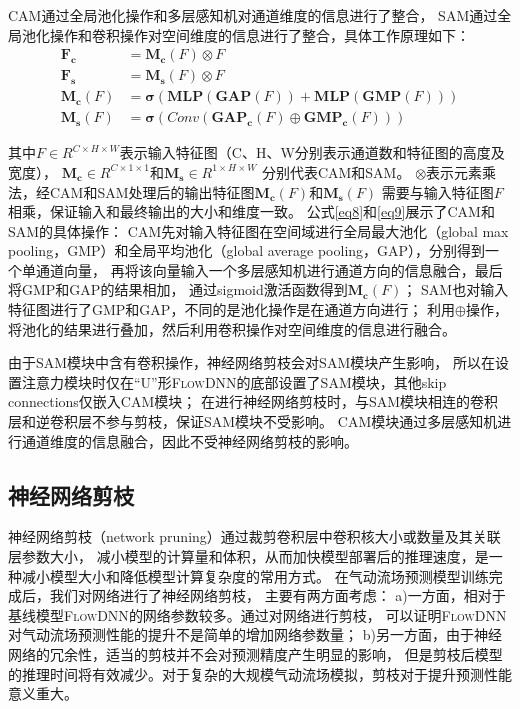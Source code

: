 CAM通过全局池化操作和多层感知机对通道维度的信息进行了整合，
SAM通过全局池化操作和卷积操作对空间维度的信息进行了整合，具体工作原理如下：
\begin{align}
\mathbf{F}_{\mathbf{c}} &=\mathbf{M}_{\mathbf{c}}(F) \otimes F \\
\mathbf{F}_{\mathbf{s}} &=\mathbf{M}_{\mathbf{s}}\left(F\right) \otimes F \\
\mathbf{M}_{\mathbf{c}}(F) &=\mathbf{\sigma}(\mathbf{MLP}(\mathbf{GAP}(F))+\mathbf{MLP}(\mathbf{GMP}(F))) \label{eq8}\\
\mathbf{M}_{\mathbf{s}}(F) &=\mathbf{\sigma}\left(Conv\left(\mathbf{GAP}_\mathbf{c}\left(F\right) \oplus \mathbf{GMP}_\mathbf{c}\left(F\right)\right)\right) \label{eq9}
\end{align}

\noindent 其中$F \in R^{C \times H \times W}$表示输入特征图（C、H、W分别表示通道数和特征图的高度及宽度），
$\mathbf{M}_{\mathbf{c}} \in R^{C \times 1 \times 1}$和$\mathbf{M}_{\mathbf{s}} \in R^{1 \times H \times W}$
分别代表CAM和SAM。
$\otimes$表示元素乘法，经CAM和SAM处理后的输出特征图$\mathbf{M}_{\mathbf{c}}(F)$和$\mathbf{M}_{\mathbf{s}}\left(F\right)$
需要与输入特征图$F$相乘，保证输入和最终输出的大小和维度一致。
公式\ref{eq8}和\ref{eq9}展示了CAM和SAM的具体操作：
CAM先对输入特征图在空间域进行全局最大池化（global  max pooling，GMP）和全局平均池化（global average pooling，GAP），分别得到一个单通道向量，
再将该向量输入一个多层感知机进行通道方向的信息融合，最后将GMP和GAP的结果相加，
通过sigmoid激活函数得到$\mathbf{M}_{\mathbf{c}}(F)$；
SAM也对输入特征图进行了GMP和GAP，不同的是池化操作是在通道方向进行；
利用$\oplus$操作，将池化的结果进行叠加，然后利用卷积操作对空间维度的信息进行融合。

由于SAM模块中含有卷积操作，神经网络剪枝会对SAM模块产生影响，
所以在设置注意力模块时仅在“U”形\textsc{FlowDNN}的底部设置了SAM模块，其他skip connections仅嵌入CAM模块；
在进行神经网络剪枝时，与SAM模块相连的卷积层和逆卷积层不参与剪枝，保证SAM模块不受影响。
CAM模块通过多层感知机进行通道维度的信息融合，因此不受神经网络剪枝的影响。


\subsection{神经网络剪枝}
神经网络剪枝（network pruning）通过裁剪卷积层中卷积核大小或数量及其关联层参数大小，
减小模型的计算量和体积，从而加快模型部署后的推理速度，是一种减小模型大小和降低模型计算复杂度的常用方式。
在气动流场预测模型训练完成后，我们对网络进行了神经网络剪枝\cite{DBLP:conf/iclr/LiuSZHD19}，
主要有两方面考虑：
a)一方面，相对于基线模型\textsc{FlowDNN}的网络参数较多。通过对网络进行剪枝，
可以证明\textsc{FlowDNN}对气动流场预测性能的提升不是简单的增加网络参数量；
b)另一方面，由于神经网络的冗余性，适当的剪枝并不会对预测精度产生明显的影响，
但是剪枝后模型的推理时间将有效减少。对于复杂的大规模气动流场模拟，剪枝对于提升预测性能意义重大。

